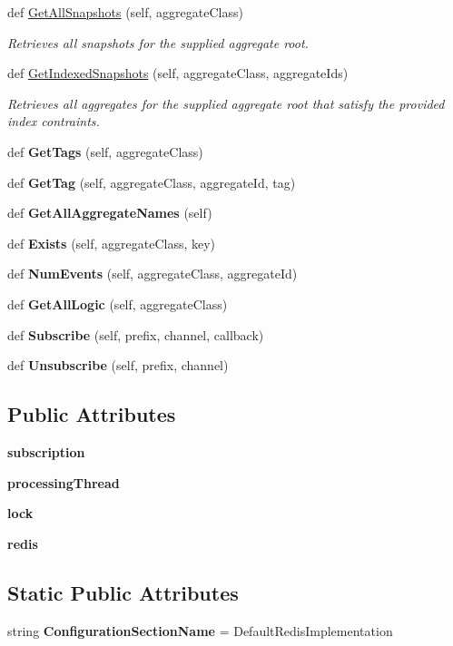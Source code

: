 \begin{DoxyCompactItemize}
def \hyperlink{group__Chronos_gaff0db56eede5a1e7f18cf025e4fe11cd}{Get\+All\+Snapshots} (self, aggregate\+Class)
\begin{DoxyCompactList}\small\item\em Retrieves all snapshots for the supplied aggregate root. \end{DoxyCompactList}\item 
def \hyperlink{group__Chronos_gaaffd95b785639b226c4358f443fb072d}{Get\+Indexed\+Snapshots} (self, aggregate\+Class, aggregate\+Ids)
\begin{DoxyCompactList}\small\item\em Retrieves all aggregates for the supplied aggregate root that satisfy the provided index contraints. \end{DoxyCompactList}\item 
def {\bfseries Get\+Tags} (self, aggregate\+Class)
\item 
def {\bfseries Get\+Tag} (self, aggregate\+Class, aggregate\+Id, tag)
\item 
def {\bfseries Get\+All\+Aggregate\+Names} (self)
\item 
def {\bfseries Exists} (self, aggregate\+Class, key)
\item 
def {\bfseries Num\+Events} (self, aggregate\+Class, aggregate\+Id)
\item 
def {\bfseries Get\+All\+Logic} (self, aggregate\+Class)
\item 
def {\bfseries Subscribe} (self, prefix, channel, callback)
\item 
def {\bfseries Unsubscribe} (self, prefix, channel)
\end{DoxyCompactItemize}
\subsection*{Public Attributes}
\begin{DoxyCompactItemize}
\item 
{\bfseries subscription}
\item 
{\bfseries processing\+Thread}
\item 
{\bfseries lock}
\item 
{\bfseries redis}
\end{DoxyCompactItemize}
\subsection*{Static Public Attributes}
\begin{DoxyCompactItemize}
\item 
string {\bfseries Configuration\+Section\+Name} = \textquotesingle{}Default\+Redis\+Implementation\textquotesingle{}
\end{DoxyCompactItemize}


